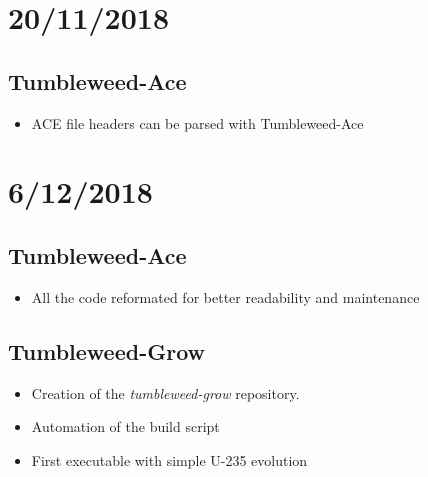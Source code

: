 \section*{20/11/2018}%
\label{sec:20_11_2018}

\subsection*{Tumbleweed-Ace}%
\label{sub:tumbleweed_ace}

\begin{itemize}
        \item ACE file headers can be parsed with Tumbleweed-Ace
\end{itemize}

\section*{6/12/2018}
\subsection*{Tumbleweed-Ace}%
\label{sub:tumbleweed_ace}

\begin{itemize}
        \item All the code reformated for better readability and maintenance
\end{itemize}

\subsection*{Tumbleweed-Grow}%
\label{sub:tumbleweed_grow}

\begin{itemize}
        \item Creation of the \emph{tumbleweed-grow} repository.
        \item Automation of the build script
        \item First executable with simple U-235 evolution
\end{itemize}


